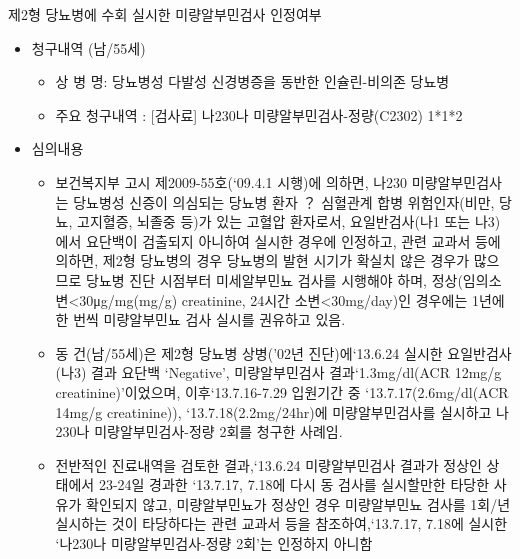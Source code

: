 제2형 당뇨병에 수회 실시한 미량알부민검사 인정여부 \par
\begin{itemize}[■]\tightlist
\item 청구내역 (남/55세)
	\begin{itemize}[-]\tightlist
	\item 상 병 명: 당뇨병성 다발성 신경병증을 동반한 인슐린-비의존 당뇨병 
	\item 주요 청구내역 : [검사료] 나230나 미량알부민검사-정량(C2302) 1*1*2 
	\end{itemize}
\item 심의내용 
	\begin{itemize}[○]\tightlist
	\item 보건복지부 고시 제2009-55호(‘09.4.1 시행)에 의하면, 나230 미량알부민검사는 당뇨병성 신증이 의심되는 당뇨병 환자 ？ 심혈관계 합병 위험인자(비만, 당뇨, 고지혈증, 뇌졸중 등)가 있는 고혈압 환자로서, 요일반검사(나1 또는 나3)에서 요단백이 검출되지 아니하여 실시한 경우에 인정하고,
관련 교과서 등에 의하면, 제2형 당뇨병의 경우 당뇨병의 발현 시기가 확실치 않은 경우가 많으므로 당뇨병 진단 시점부터 미세알부민뇨 검사를 시행해야 하며, 정상(임의소변<30μg/mg(mg/g) creatinine, 24시간 소변<30mg/day)인 경우에는 1년에 한 번씩 미량알부민뇨 검사 실시를 권유하고 있음. 
	\item 동 건(남/55세)은 제2형 당뇨병 상병('02년 진단)에‘13.6.24 실시한 요일반검사(나3) 결과 요단백 ‘Negative’, 미량알부민검사 결과‘1.3mg/dl(ACR 12mg/g creatinine)’이었으며, 이후‘13.7.16-7.29 입원기간 중 ‘13.7.17(2.6mg/dl(ACR 14mg/g creatinine)), ‘13.7.18(2.2mg/24hr)에 미량알부민검사를 실시하고 나230나 미량알부민검사-정량 2회를 청구한 사례임. 
	\item 전반적인 진료내역을 검토한 결과,‘13.6.24 미량알부민검사 결과가 정상인 상태에서 23-24일 경과한 ‘13.7.17, 7.18에 다시 동 검사를 실시할만한 타당한 사유가 확인되지 않고, 미량알부민뇨가 정상인 경우 미량알부민뇨 검사를 1회/년 실시하는 것이 타당하다는 관련 교과서 등을 참조하여,‘13.7.17, 7.18에 실시한 ‘나230나 미량알부민검사-정량 2회’는 인정하지 아니함
	\end{itemize}
\end{itemize}